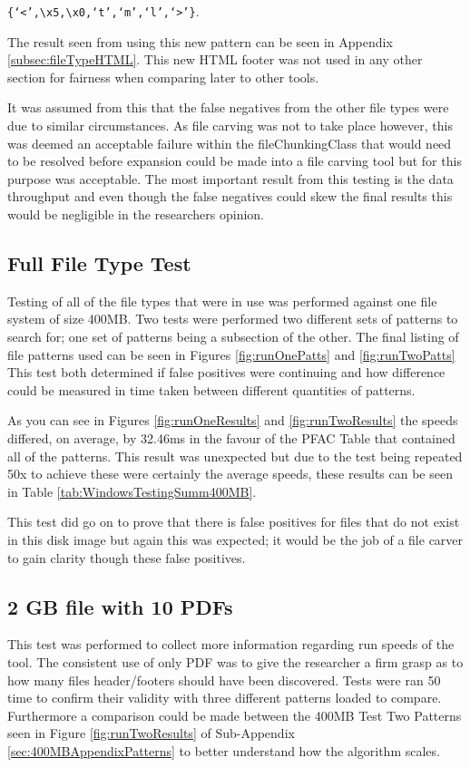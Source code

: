 {\centering
\texttt{\{`<',{\textbackslash}x5,{\textbackslash}x0,`t',`m',`l',`>'\}}.
\par}

The result seen from using this new pattern can be seen in Appendix \ref{subsec:fileTypeHTML}.
This new HTML footer was not used in any other section for fairness when comparing later to other tools.

It was assumed from this that the false negatives from the other file types were due to similar circumstances.
As file carving was not to take place however, this was deemed an acceptable failure within the fileChunkingClass that would need to be resolved before expansion could be made into a file carving tool but for this purpose was acceptable.
The most important result from this testing is the data throughput and even though the false negatives could skew the final results this would be negligible in the researchers opinion.

\subsection{Full File Type Test}
Testing of all of the file types that were in use was performed against one file system of size 400MB.
Two tests were performed two different sets of patterns to search for; one set of patterns being a subsection of the other.
The final listing of file patterns used can be seen in Figures \ref{fig:runOnePatts} and \ref{fig:runTwoPatts}
This test both determined if false positives were continuing and how difference could be measured in time taken between different quantities of patterns.

As you can see in Figures \ref{fig:runOneResults} and \ref{fig:runTwoResults} the speeds differed, on average, by 32.46ms in the favour of the PFAC Table that contained all of the patterns.
This result was unexpected but due to the test being repeated 50x to achieve these were certainly the average speeds, these results can be seen in Table \ref{tab:WindowsTestingSumm400MB}.

This test did go on to prove that there is false positives for files that do not exist in this disk image but again this was expected;
it would be the job of a file carver to gain clarity though these false positives.

\subsection{2 \acl{GB} file with 10 PDFs}
\label{sec:400MBand2GBtookSimilarTimes}
This test was performed to collect more information regarding run speeds of the tool.
The consistent use of only PDF was to give the researcher a firm grasp as to how many files header/footers should have been discovered.
Tests were ran 50 time to confirm their validity with three different patterns loaded to compare.
Furthermore a comparison could be made between the 400\ac{MB} Test Two Patterns seen in Figure \ref{fig:runTwoResults} of Sub-Appendix \ref{sec:400MBAppendixPatterns} to better understand how the algorithm scales.

